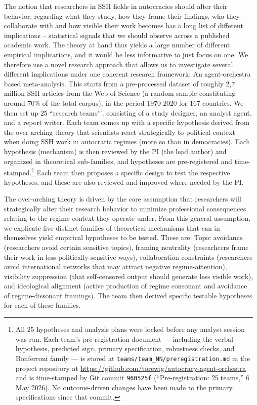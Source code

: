 \documentclass[12pt,a4paper]{article}
\begin{document}
The notion that researchers in SSH fields in autocracies should alter their behavior, regarding what they study, how they frame their findings, who they collaborate with and how visible their work becomes has a long list of different implications -- statistical signals that we should observe across a published academic work. The theory at hand thus yields a large number of different empirical implications, and it would be less informative to just focus on one. We therefore use a novel research approach that allows us to investigate several different implications under one coherent research framework: An agent-orchestra based meta-analysis. This starts from a pre-processed dataset of roughly 2,7 million SSH articles from the Web of Science (a random sample constituting around $70\%$ of the total corpus), in the period 1970-2020 for 167 countries. We then set up 25 ``research teams"', consisting of a study designer, an analyst agent, and a report writer. Each team comes up with a specific hypothesis derived from the over-arching theory that scientists react strategically to political context when doing SSH work in autocratic regimes (more so than in democracies). Each hypothesis (mechanism) is then reviewed by the PI (the lead author) and organized in theoretical sub-families, and hypotheses are pre-registered and time-stamped.\footnote{All 25 hypotheses and analysis plans were locked before any analyst session was run. Each team's pre-registration document --- including the verbal hypothesis, predicted sign, primary specification, robustness checks, and Bonferroni family --- is stored at \texttt{teams/team\_NN/preregistration.md} in the project repository at \url{https://github.com/torewig/autocracy-agent-orchestra} and is time-stamped by Git commit \texttt{960525f} (``Pre-registration: 25 teams,'' 6 May 2026). No outcome-driven changes have been made to the primary specifications since that commit.} Each team then proposes a specific design to test the respective hypotheses, and these are also reviewed and improved where needed by the PI.

The over-arching theory is driven by the core assumption that researchers will strategically alter their research behavior to minimize professional consequences relating to the regime-context they operate under. From this general assumption, we explicate five distinct families of theoretical mechanisms that can in themselves yield empirical hypotheses to be tested. These are: Topic avoidance (researchers avoid certain sensitive topics), framing neutrality (researhcers frame their work in less politically sensitive ways), collaboration constraints (researchers avoid international networks that may attract negative regime-attention), visibility suppression (that self-censored output should generate less visible work), and ideological alignment (active production of regime consonant and avoidance of regime-dissonant framings). The team then derived specific testable hypotheses for each of these families.
\end{document}

